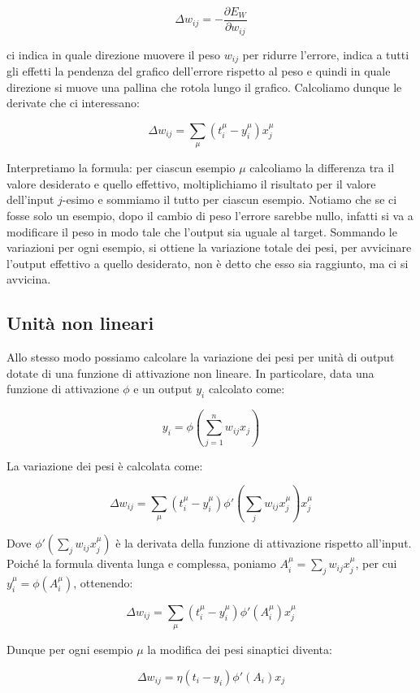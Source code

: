 \begin{equation}
	\Delta w_{ij} = - \frac{\partial E_W}{\partial w_{ij}}
\end{equation}

ci indica in quale direzione muovere il peso $w_{ij}$ per ridurre l'errore,
indica a tutti gli effetti la pendenza del grafico dell'errore rispetto al peso
e quindi in quale direzione si muove una pallina che rotola lungo il grafico.
Calcoliamo dunque le derivate che ci interessano:

\begin{equation}
	\Delta w_{ij} = \sum_{\mu}(t^{\mu}_i - y^{\mu}_i) x^{\mu}_j
\end{equation}

Interpretiamo la formula: per ciascun esempio $\mu$ calcoliamo la differenza tra
il valore desiderato e quello effettivo, moltiplichiamo il risultato per il
valore dell'input $j$-esimo e sommiamo il tutto per ciascun esempio. Notiamo che
se ci fosse solo un esempio, dopo il cambio di peso l'errore sarebbe nullo,
infatti si va a modificare il peso in modo tale che l'output sia uguale al
target. Sommando le variazioni per ogni esempio, si ottiene la variazione totale
dei pesi, per avvicinare l'output effettivo a quello desiderato, non è detto che
esso sia raggiunto, ma ci si avvicina.

\subsection{Unità non lineari}

Allo stesso modo possiamo calcolare la variazione dei pesi per unità di output
dotate di una funzione di attivazione non lineare. In particolare, data una
funzione di attivazione $\phi$ e un output $y_i$ calcolato come:

\begin{equation}
	y_i = \phi(\sum_{j=1}^n w_{ij} x_j)
\end{equation}

La variazione dei pesi è calcolata come:

\begin{equation}
	\Delta w_{ij} = \sum_{\mu}(t^{\mu}_i - y^{\mu}_i) \phi'(\sum_j w_{ij} x^\mu_j) x^{\mu}_j
\end{equation}

Dove $\phi'(\sum_j w_{ij} x^\mu_j)$ è la derivata della funzione di attivazione
rispetto all'input. Poiché la formula diventa lunga e complessa,
poniamo $A^{\mu}_i = \sum_j w_{ij} x^\mu_j$, per cui
$y^{\mu}_i = \phi(A^{\mu}_i)$, ottenendo:

\begin{equation}
	\Delta w_{ij} = \sum_{\mu}(t^{\mu}_i - y^{\mu}_i) \phi'(A^{\mu}_i) x^{\mu}_j
\end{equation}

Dunque per ogni esempio $\mu$ la modifica dei pesi sinaptici diventa:

\begin{equation}
	\Delta w_{ij} = \eta (t_i - y_i) \phi'(A_i) x_j
\end{equation}
